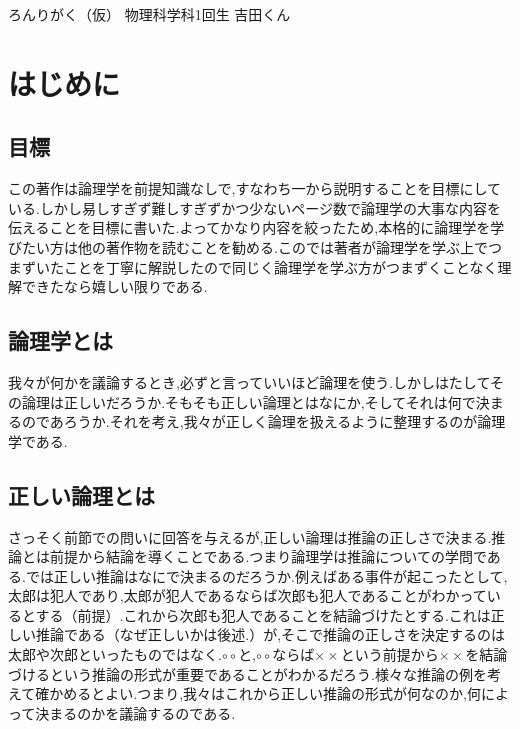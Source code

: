 \documentclass[10pt,b5paper,papersize,dvipdfmx]{jsbook}
\begin{document}

\kaishititle%
  {ろんりがく（仮）}%
  {物理科学科1回生}%
  {吉田くん}%

\section{はじめに}
\subsection{目標}
この著作は論理学を前提知識なしで,すなわち一から説明することを目標にしている.しかし易しすぎず難しすぎずかつ少ないページ数で論理学の大事な内容を伝えることを目標に書いた.よってかなり内容を絞ったため,本格的に論理学を学びたい方は他の著作物を読むことを勧める.このでは著者が論理学を学ぶ上でつまずいたことを丁寧に解説したので同じく論理学を学ぶ方がつまずくことなく理解できたなら嬉しい限りである.

\subsection{論理学とは}
我々が何かを議論するとき,必ずと言っていいほど論理を使う.しかしはたしてその論理は正しいだろうか.そもそも正しい論理とはなにか,そしてそれは何で決まるのであろうか.それを考え,我々が正しく論理を扱えるように整理するのが論理学である.
\subsection{正しい論理とは}
さっそく前節での問いに回答を与えるが,正しい論理は推論の正しさで決まる.推論とは前提から結論を導くことである.つまり論理学は推論についての学問である.では正しい推論はなにで決まるのだろうか.例えばある事件が起こったとして,太郎は犯人であり,太郎が犯人であるならば次郎も犯人であることがわかっているとする（前提）.これから次郎も犯人であることを結論づけたとする.これは正しい推論である（なぜ正しいかは後述.）が,そこで推論の正しさを決定するのは太郎や次郎といったものではなく.$\circ \circ$と,$\circ \circ$ならば$\times \times$という前提から$\times \times$を結論づけるという推論の形式が重要であることがわかるだろう.様々な推論の例を考えて確かめるとよい.つまり,我々はこれから正しい推論の形式が何なのか,何によって決まるのかを議論するのである.
\end{document}
